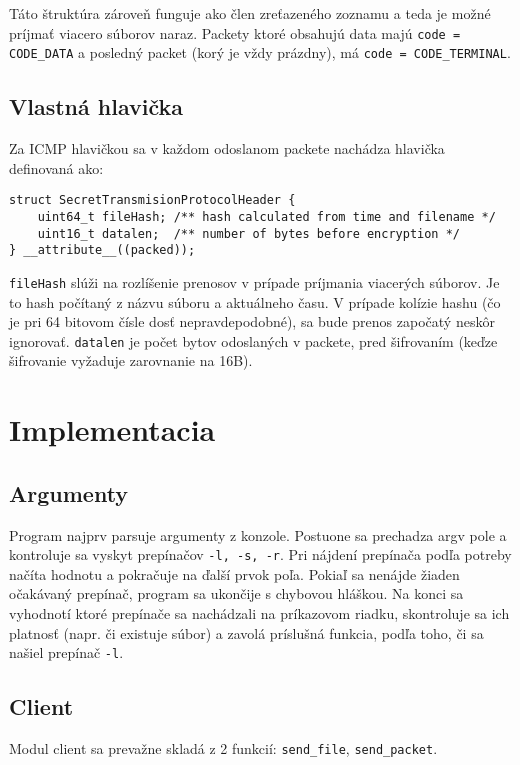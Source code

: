 \documentclass{article}
\renewcommand{\tt}[1]{\texttt{#1}}
\begin{document}
Táto štruktúra zároveň funguje ako člen zreťazeného zoznamu a teda je možné príjmať viacero súborov naraz.
Packety ktoré obsahujú data majú \tt{code = CODE\_DATA} a posledný packet (korý je vždy prázdny), má \tt{code = CODE\_TERMINAL}.

\subsection{Vlastná hlavička}
Za ICMP hlavičkou sa v každom odoslanom packete nachádza hlavička definovaná ako:

\begin{verbatim}
struct SecretTransmisionProtocolHeader {
    uint64_t fileHash; /** hash calculated from time and filename */
    uint16_t datalen;  /** number of bytes before encryption */
} __attribute__((packed));
\end{verbatim}

\tt{fileHash} slúži na rozlíšenie prenosov v prípade príjmania viacerých súborov. 
Je to hash počítaný z názvu súboru a aktuálneho času.
V prípade kolízie hashu (čo je pri 64 bitovom čísle dosť nepravdepodobné), sa bude prenos započatý neskôr ignorovať.
\tt{datalen} je počet bytov odoslaných v packete, pred šifrovaním (keďze šifrovanie vyžaduje zarovnanie na 16B).

\section{Implementacia}

\subsection{Argumenty}
Program najprv parsuje argumenty z konzole.
Postuone sa prechadza argv pole a kontroluje sa vyskyt prepínačov \tt{-l, -s, -r}. 
Pri nájdení prepínača podľa potreby načíta hodnotu a pokračuje na ďalší prvok poľa.
Pokiaľ sa nenájde žiaden očakávaný prepínač, program sa ukončije s chybovou hláškou.
Na konci sa vyhodnotí ktoré prepínače sa nachádzali na príkazovom riadku, 
skontroluje sa ich platnosť (napr. či existuje súbor) a zavolá príslušná funkcia,
podľa toho, či sa našiel prepínač \tt{-l}.

\subsection{Client}
Modul client sa prevažne skladá z 2 funkcií: \tt{send\_file}, \tt{send\_packet}.
\end{document}
